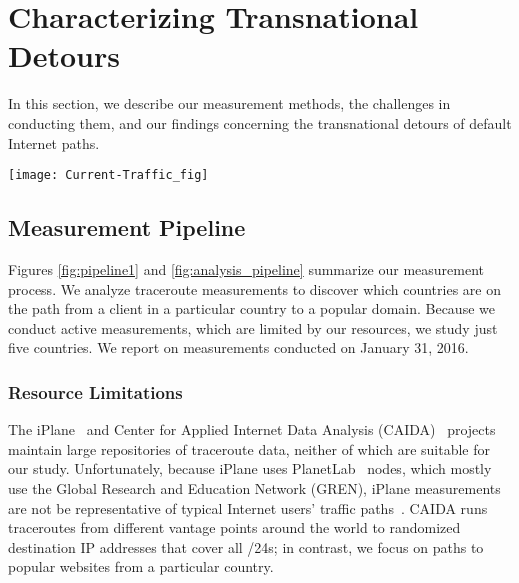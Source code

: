 \section{Characterizing Transnational Detours}
\label{datasets}
In this section, we describe our measurement methods, the challenges in
conducting them, and our findings concerning the transnational detours
of default Internet paths.

\begin{figure*}[t]
\centering
\texttt{[image: Current-Traffic\_fig]}
\caption{Measurement pipeline to study Internet paths from countries to
  popular domains.}
\label{fig:pipeline1}
\end{figure*}


\subsection{Measurement Pipeline}
\label{pipeline}

Figures \ref{fig:pipeline1} and \ref{fig:analysis_pipeline} summarize
our measurement process.  We analyze traceroute measurements to
discover which countries are on the path from a client in a particular
country to a popular domain.  
Because we conduct active measurements, which are limited by our
resources, we study just five countries.  We report on measurements
conducted on January 31, 2016.

\subsubsection{Resource Limitations}
\label{resource_limits}

The iPlane~\cite{madhyastha2006iplane} and Center for Applied Internet
Data Analysis (CAIDA)~\cite{caida} projects maintain large
repositories of traceroute data, neither of which are suitable for our
study.  
Unfortunately, because iPlane uses PlanetLab~\cite{PlanetLab} nodes,
which mostly use the Global Research and Education Network (GREN), 
iPlane measurements are not be representative of typical Internet
users' traffic paths~\cite{banerjee2004interdomain}.  CAIDA runs
traceroutes from different vantage points around the world to
randomized destination IP addresses that cover all /24s; in contrast,
we focus on paths to popular websites from a particular country.

